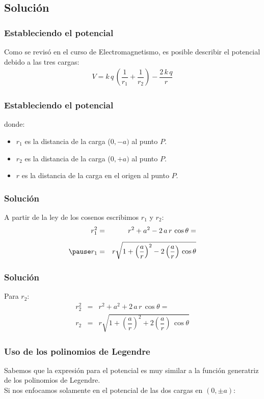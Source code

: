 \subsection{Solución}
\begin{frame}
\frametitle{Estableciendo el potencial}
Como se revisó en el curso de Electromagnetismo, es posible describir el potencial debido a las tres cargas:
\pause
\begin{align}
V = k \, q \, \left( \dfrac{1}{r_{1}} + \dfrac{1}{r_{2}} \right) - \dfrac{2 \, k \, q}{r}
\label{eq:ecuacion_01}
\end{align}
\end{frame}
\begin{frame}
\frametitle{Estableciendo el potencial}
\begin{figure}
    \centering
    
\end{figure}
\pause
\fontsize{12}{12}\selectfont
donde:
\begin{itemize}
\item $r_{1}$ es la distancia de la carga ($0, -a)$ al punto $P$.
\item $r_{2}$ es la distancia de la carga ($0, +a)$ al punto $P$.
\item $r$ es la distancia de la carga en el origen al punto $P$.
\end{itemize}
\end{frame}
\begin{frame}
\frametitle{Solución}
A partir de la ley de los cosenos escribimos $r_{1}$ y $r_{2}$:
\pause
\begin{eqnarray*}
r_{1}^{2} &=& r^{2} + a^{2} - 2 \, a \, r \, \cos \theta =  \\[0.5em] \pause 
r_{1} &=& r \sqrt{1 + \left( \dfrac{a}{r} \right)^{2} - 2 \left( \dfrac{a}{r} \right) \, \cos \theta}
\end{eqnarray*}
\end{frame}
\begin{frame}
\frametitle{Solución}
Para $r_{2}$:
\pause
\begin{eqnarray*}
r_{2}^{2} &=& r^{2} + a^{2} + 2 \, a \, r \, \cos \theta =  \\[0.5em]
r_{2} &=& r \sqrt{1 + \left( \dfrac{a}{r} \right)^{2} + 2 \left( \dfrac{a}{r} \right) \, \cos \theta}
\end{eqnarray*}
\end{frame}
\begin{frame}
\frametitle{Uso de los polinomios de Legendre}
Sabemos que la expresión para el potencial es muy similar a la función generatriz de los polinomios de Legendre.
\\
\bigskip
\pause
Si nos enfocamos solamente en el potencial de las dos cargas en $(0,\pm a)$:
\end{frame}
